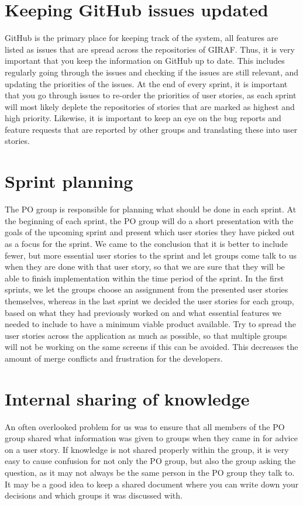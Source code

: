\section{Keeping GitHub issues updated}
GitHub is the primary place for keeping track of the system, all features are listed as issues that are spread across the repositories of GIRAF.
Thus, it is very important that you keep the information on GitHub up to date.
This includes regularly going through the issues and checking if the issues are still relevant, and updating the priorities of the issues. 
At the end of every sprint, it is important that you go through issues to re-order the priorities of user stories, as each sprint will most likely deplete the repositories of stories that are marked as highest and high priority.
Likewise, it is important to keep an eye on the bug reports and feature requests that are reported by other groups and translating these into user stories.

\section{Sprint planning}
The PO group is responsible for planning what should be done in each sprint.
At the beginning of each sprint, the PO group will do a short presentation with the goals of the upcoming sprint and present which user stories they have picked out as a focus for the sprint.
We came to the conclusion that it is better to include fewer, but more essential user stories to the sprint and let groups come talk to us when they are done with that user story, so that we are sure that they will be able to finish implementation within the time period of the sprint.
In the first sprints, we let the groups choose an assignment from the presented user stories themselves, whereas in the last sprint we decided the user stories for each group, based on what they had previously worked on and what essential features we needed to include to have a minimum viable product available.
Try to spread the user stories across the application as much as possible, so that multiple groups will not be working on the same screens if this can be avoided.
This decreases the amount of merge conflicts and frustration for the developers.

\section{Internal sharing of knowledge}
An often overlooked problem for us was to ensure that all members of the PO group shared what information was given to groups when they came in for advice on a user story.
If knowledge is not shared properly within the group, it is very easy to cause confusion for not only the PO group, but also the group asking the question, as it may not always be the same person in the PO group they talk to.
It may be a good idea to keep a shared document where you can write down your decisions and which groups it was discussed with.
